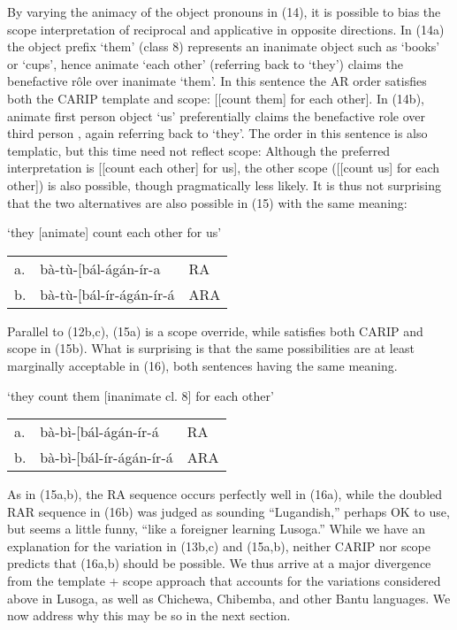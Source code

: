 \documentclass[output=paper,
modfonts
]{LSP/langsci}
\begin{document}
\noindent By varying the animacy of the object pronouns in (14), it is possible to
bias the scope interpretation of reciprocal and applicative in opposite
directions. In (14a) the object prefix  `them' (class 8)
represents an inanimate object such as  `books' or
 `cups', hence animate `each other' (referring back to
 `they') claims the benefactive rôle over inanimate
 `them'. In this sentence the AR order 
satisfies both the CARIP template and scope: {[}{[}count them{]} for
each other{]}. In (14b), animate first person object  `us'
preferentially claims the benefactive role over third person
, again referring back to  `they'. The
 order in this sentence is also templatic, but this time
need not reflect scope: Although the preferred interpretation is
{[}{[}count each other{]} for us{]}, the other scope ({[}{[}count us{]} for each other{]}) is also possible, though pragmatically less
likely. It is thus not surprising that the two alternatives are also
possible in (15) with the same meaning:

\ea `they {[}animate{]} count each other for us'\\
\begin{tabular}{@{}lll@{}}
a. & bà-tù-{[}bál-ágán-ír-a & RA \\
b. & bà-tù-{[}bál-ír-ágán-ír-á & ARA \\
\end{tabular}
\z

\noindent Parallel to (12b,c), (15a) is a scope override, while
 satisfies both CARIP and scope in (15b). What is
surprising is that the same possibilities are at least marginally
acceptable in (16), both sentences having the same meaning.

\ea `they count them {[}inanimate cl. 8{]} for each other'\\
\begin{tabular}{@{}lll@{}}
a. & bà-bì-{[}bál-ágán-ír-á & RA \\
b. & \ljudge{??}bà-bì-{[}bál-ír-ágán-ír-á & ARA \\
\end{tabular}
\z

\noindent As in (15a,b), the RA sequence occurs perfectly well in (16a), while the
doubled RAR sequence in (16b) was judged as sounding ``Lugandish,''
perhaps OK to use, but seems a little funny, ``like a foreigner learning
Lusoga.'' While we have an explanation for the variation in (13b,c) and
(15a,b), neither CARIP nor scope predicts that (16a,b) should be
possible. We thus arrive at a major divergence from the template + scope
approach that accounts for the variations considered above in Lusoga, as
well as Chichewa, Chibemba, and other Bantu languages. We now address
why this may be so in the next section.
\end{document}
